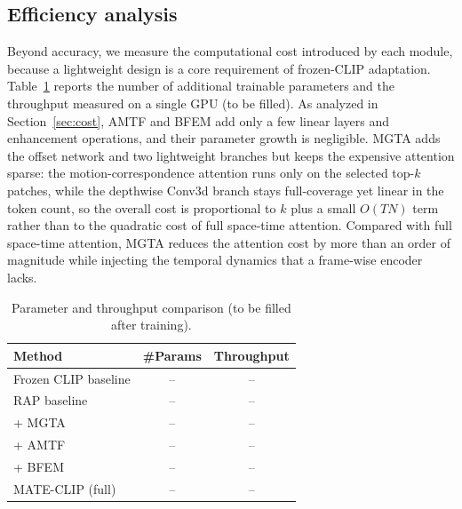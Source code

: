 \subsection{Efficiency analysis}
\label{sec:efficiency}
Beyond accuracy, we measure the computational cost introduced by each module, because a lightweight design is a core requirement of frozen-CLIP adaptation.
Table~\ref{tab:efficiency} reports the number of additional trainable parameters and the throughput measured on a single GPU (to be filled).
As analyzed in Section~\ref{sec:cost}, AMTF and BFEM add only a few linear layers and enhancement operations, and their parameter growth is negligible.
MGTA adds the offset network and two lightweight branches but keeps the expensive attention sparse: the motion-correspondence attention runs only on the selected top-$k$ patches, while the depthwise Conv3d branch stays full-coverage yet linear in the token count, so the overall cost is proportional to $k$ plus a small $O(T N)$ term rather than to the quadratic cost of full space-time attention.
Compared with full space-time attention, MGTA reduces the attention cost by more than an order of magnitude while injecting the temporal dynamics that a frame-wise encoder lacks.

\begin{table}[t]
  \centering
  \footnotesize
  \begin{tabular}{lcc}
    \hline
    Method & \#Params & Throughput \\
    \hline
    Frozen CLIP baseline & -- & -- \\
    RAP baseline & -- & -- \\
    + MGTA & -- & -- \\
    + AMTF & -- & -- \\
    + BFEM & -- & -- \\
    MATE-CLIP (full) & -- & -- \\
    \hline
  \end{tabular}
  \caption{Parameter and throughput comparison (to be filled after training).}
  \label{tab:efficiency}
\end{table}

